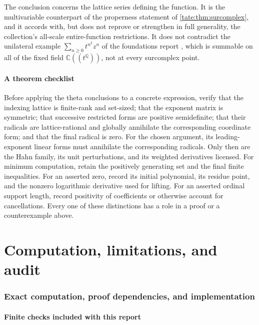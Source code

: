 \documentclass[11pt,letterpaper]{article}
\theoremstyle{definition}
\newcommand{\C}{\mathbb C}
\newcommand{\Q}{\mathbb Q}
\begin{document}
The conclusion concerns the lattice series defining the function. It is the
multivariable counterpart of the properness statement of
\cref{tate:thm:surcomplex}, and it accords with, but does not reprove or
strengthen in full generality, the collection's all-scale entire-function
restrictions. It does not contradict the unilateral example
$\sum_{n\ge0}t^{n^2}z^n$ of the foundations report \cite{RepoFoundations},
which is summable on all of the fixed field $\C((t^\Q))$, not at every
surcomplex point.

\subsection{A theorem checklist}\label{tate:theta:sec:checklist}

Before applying the theta conclusions to a concrete expression, verify
that the indexing lattice is finite-rank and set-sized; that the exponent
matrix is symmetric; that successive restricted forms are positive
semidefinite; that their radicals are lattice-rational and globally
annihilate the corresponding coordinate form; and that the final radical
is zero. For the chosen argument, its leading-exponent linear forms must
annihilate the corresponding radicals. Only then are the Hahn family, its
unit perturbations, and its weighted derivatives licensed. For minimum
computation, retain the positively generating set and the final finite
inequalities. For an asserted zero, record its initial polynomial, its
residue point, and the nonzero logarithmic derivative used for lifting.
For an asserted ordinal support length, record positivity of coefficients
or otherwise account for cancellations. Every one of these distinctions has
a role in a proof or a counterexample above.

\part{Computation, limitations, and audit}\label{tate:part:computation}

\section{Exact computation, proof dependencies, and implementation}
\label{tate:sec:computation}

\subsection{Finite checks included with this report}
\end{document}
